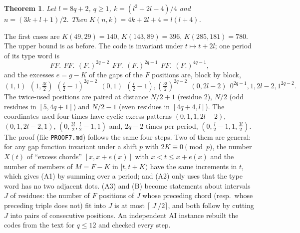 \documentclass[11pt]{article}
\newtheorem{theorem}{Theorem}
\theoremstyle{remark}
\begin{document}
\begin{theorem}\label{four2}
Let $l=8q+2$, $q\ge1$, $k=(l^2+2l-4)/4$ and $n=(3k+l+1)/2$. Then $K(n,k)=4k+2l+4=l(l+4)$.
\end{theorem}
\noindent The first cases are $K(49,29)=140$, $K(143,89)=396$, $K(285,181)=780$. The upper bound is as before. The code is invariant
under $t\mapsto t+2l$; one period of its type word is
\[ FF.\ \,FF.\ \,(F.)^{2q-2}\ \,FF.\ \,(F.)^{2q-1}\ \,FF.\ \,(F.)^{4q-1}, \]
and the excesses $e=g-K$ of the gaps of the $F$ positions are, block by block,
\[ (1,1)\ \ (1,\tfrac{3l}{2})\ \ (\tfrac l2-1)^{2q-2}\ \ (0,1)\ \ (\tfrac l2-1),(\tfrac{3l}{2})^{2q-2}\ \ (0,2l-2)\ \ 0^{2q-1},1,2l-2,1^{2q-2}. \]
The twice-used positions are paired at distance $N/2+1$ (residue $2$), $N/2$ (odd residues in $[5,4q+1]$) and $N/2-1$
(even residues in $[4q+4,l]$). The coordinates used four times have cyclic excess patterns $(0,1,1,2l-2)$, $(0,1,2l-2,1)$,
$(0,\frac{3l}2,\frac l2-1,1)$ and, $2q-2$ times per period, $(0,\frac l2-1,1,\frac{3l}2)$.
The proof (file \texttt{PROOF7.md}) follows the same four steps. Two of them are general: for any gap function invariant under a
shift $p$ with $2K\equiv 0\pmod p$, the number $X(t)$ of ``excess chords'' $[x,x+e(x)]$ with $x<t\le x+e(x)$ and the number of
members of $M=F-K$ in $[t,t+K)$ have the same increments in $t$, which gives (A1) by summing over a period; and (A2) only uses
that the type word has no two adjacent dots. (A3) and (B) become statements about intervals $J$ of residues: the number of
$F$ positions of $J$ whose preceding chord (resp.\ whose preceding triple does not) fit into $J$ is at most $\lceil |J|/2\rceil$,
and both follow by cutting $J$ into pairs of consecutive positions. An independent AI instance rebuilt the codes from the text
for $q\le 12$ and checked every step.
\end{document}
